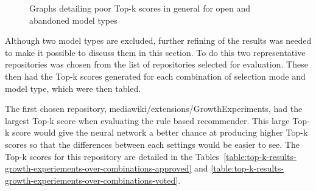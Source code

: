 \begin{figure}[h]%
    \centering
    \caption{Graphs detailing poor Top-k scores in general for open and abandoned model types}%
    \label{fig:top-k-why-only-merged-repo-specific-and-generic}%
\end{figure}

Although two model types are excluded, further refining of the results was needed to make it possible to discuss them in this section. To do this two representative repositories was chosen from the list of repositories selected for evaluation. These then had the Top-k scores generated for each combination of selection mode and model type, which were then tabled.

The first chosen repository, mediawiki/extensions/GrowthExperiments, had the largest Top-k score when evaluating the rule based recommender. This large Top-k score would give the neural network a better chance at producing higher Top-k scores so that the differences between each settings would be easier to see. The Top-k scores for this repository are detailed in the Tables~\ref{table:top-k-results-growth-experiements-over-combinations-approved} and \ref{table:top-k-results-growth-experiements-over-combinations-voted}.

